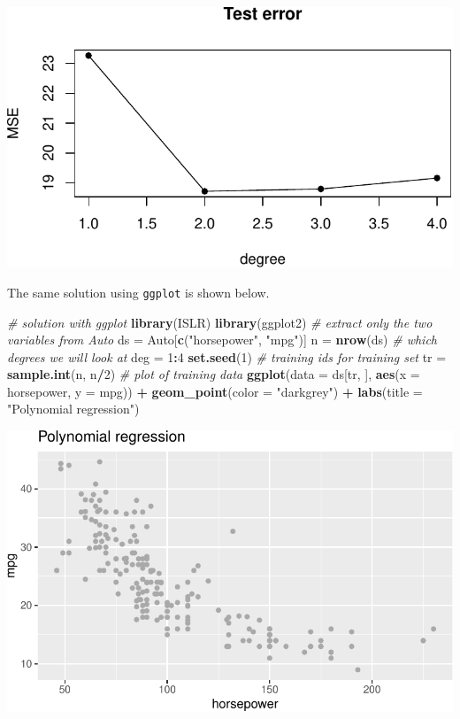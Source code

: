 \documentclass[]{article}
\newenvironment{Shaded}{\begin{snugshade}}{\end{snugshade}}
\newcommand{\CommentTok}[1]{\textcolor[rgb]{0.56,0.35,0.01}{\textit{#1}}}
\newcommand{\DataTypeTok}[1]{\textcolor[rgb]{0.13,0.29,0.53}{#1}}
\newcommand{\DecValTok}[1]{\textcolor[rgb]{0.00,0.00,0.81}{#1}}
\newcommand{\KeywordTok}[1]{\textcolor[rgb]{0.13,0.29,0.53}{\textbf{#1}}}
\newcommand{\NormalTok}[1]{#1}
\newcommand{\OperatorTok}[1]{\textcolor[rgb]{0.81,0.36,0.00}{\textbf{#1}}}
\newcommand{\StringTok}[1]{\textcolor[rgb]{0.31,0.60,0.02}{#1}}
\begin{document}
\includegraphics{RecEx7-sol_files/figure-latex/unnamed-chunk-1-2.pdf}

The same solution using \texttt{ggplot} is shown below.

\begin{Shaded}
\begin{Highlighting}[]
\CommentTok{# solution with ggplot}
\KeywordTok{library}\NormalTok{(ISLR)}
\KeywordTok{library}\NormalTok{(ggplot2)}
\CommentTok{# extract only the two variables from Auto}
\NormalTok{ds =}\StringTok{ }\NormalTok{Auto[}\KeywordTok{c}\NormalTok{(}\StringTok{"horsepower"}\NormalTok{, }\StringTok{"mpg"}\NormalTok{)]}
\NormalTok{n =}\StringTok{ }\KeywordTok{nrow}\NormalTok{(ds)}
\CommentTok{# which degrees we will look at}
\NormalTok{deg =}\StringTok{ }\DecValTok{1}\OperatorTok{:}\DecValTok{4}
\KeywordTok{set.seed}\NormalTok{(}\DecValTok{1}\NormalTok{)}
\CommentTok{# training ids for training set}
\NormalTok{tr =}\StringTok{ }\KeywordTok{sample.int}\NormalTok{(n, n}\OperatorTok{/}\DecValTok{2}\NormalTok{)}
\CommentTok{# plot of training data}
\KeywordTok{ggplot}\NormalTok{(}\DataTypeTok{data =}\NormalTok{ ds[tr, ], }\KeywordTok{aes}\NormalTok{(}\DataTypeTok{x =}\NormalTok{ horsepower, }\DataTypeTok{y =}\NormalTok{ mpg)) }\OperatorTok{+}\StringTok{ }\KeywordTok{geom_point}\NormalTok{(}\DataTypeTok{color =} \StringTok{"darkgrey"}\NormalTok{) }\OperatorTok{+}\StringTok{ }
\StringTok{    }\KeywordTok{labs}\NormalTok{(}\DataTypeTok{title =} \StringTok{"Polynomial regression"}\NormalTok{)}
\end{Highlighting}
\end{Shaded}

\includegraphics{RecEx7-sol_files/figure-latex/unnamed-chunk-2-1.pdf}
\end{document}
